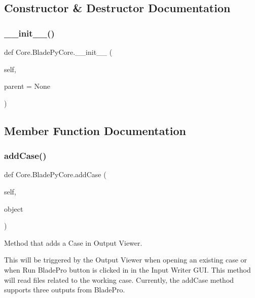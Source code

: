 \subsection{Constructor \& Destructor Documentation}
\hypertarget{class_core_1_1_blade_py_core_a10b91a0caafffe00be0f4fa9c7a022dc}{}\label{class_core_1_1_blade_py_core_a10b91a0caafffe00be0f4fa9c7a022dc} 
\subsubsection{\texorpdfstring{\+\_\+\+\_\+init\+\_\+\+\_\+()}{\_\_init\_\_()}}
{\footnotesize\ttfamily def Core.\+Blade\+Py\+Core.\+\_\+\+\_\+init\+\_\+\+\_\+ (\begin{DoxyParamCaption}\item[{}]{self,  }\item[{}]{parent = {\ttfamily None} }\end{DoxyParamCaption})}



\subsection{Member Function Documentation}
\hypertarget{class_core_1_1_blade_py_core_a1a62f9b5b8f5929bdb6f0a8c27049d9e}{}\label{class_core_1_1_blade_py_core_a1a62f9b5b8f5929bdb6f0a8c27049d9e} 
\subsubsection{\texorpdfstring{add\+Case()}{addCase()}}
{\footnotesize\ttfamily def Core.\+Blade\+Py\+Core.\+add\+Case (\begin{DoxyParamCaption}\item[{}]{self,  }\item[{}]{object }\end{DoxyParamCaption})}



Method that adds a Case in Output Viewer. 

This will be triggered by the Output Viewer when opening an existing case or when Run Blade\+Pro button is clicked in in the Input Writer G\+UI. This method will read files related to the working case. Currently, the add\+Case method supports three outputs from Blade\+Pro.

